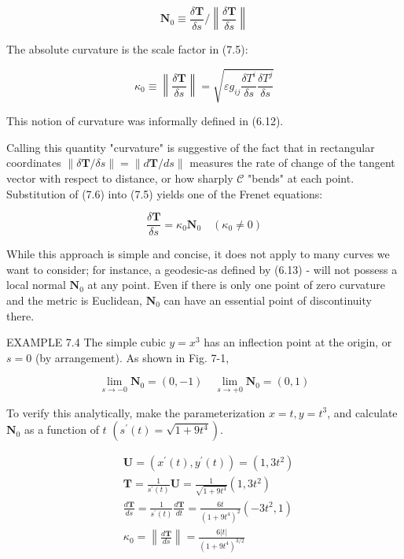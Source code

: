 \documentclass[10pt]{article}
\begin{document}
\begin{equation*}
\mathbf{N}_{0} \equiv \frac{\delta \mathbf{T}}{\delta s} /\left\|\frac{\delta \mathbf{T}}{\delta s}\right\| \tag{7.5}
\end{equation*}


The absolute curvature is the scale factor in (7.5):


\begin{equation*}
\kappa_{0} \equiv\left\|\frac{\delta \mathbf{T}}{\delta s}\right\|=\sqrt{\varepsilon g_{i j} \frac{\delta T^{i}}{\delta s} \frac{\delta T^{j}}{\delta s}} \tag{7.6}
\end{equation*}


This notion of curvature was informally defined in (6.12).

Calling this quantity "curvature" is suggestive of the fact that in rectangular coordinates $\|\delta \mathbf{T} / \delta s\|=\|d \mathbf{T} / d s\|$ measures the rate of change of the tangent vector with respect to distance, or how sharply $\mathscr{C}$ "bends" at each point. Substitution of (7.6) into (7.5) yields one of the Frenet equations:


\begin{equation*}
\frac{\delta \mathbf{T}}{\delta s}=\kappa_{0} \mathbf{N}_{0} \quad\left(\kappa_{0} \neq 0\right) \tag{7.7}
\end{equation*}


While this approach is simple and concise, it does not apply to many curves we want to consider; for instance, a geodesic-as defined by (6.13) - will not possess a local normal $\mathbf{N}_{0}$ at any point. Even if there is only one point of zero curvature and the metric is Euclidean, $\mathbf{N}_{0}$ can have an essential point of discontinuity there.

EXAMPLE 7.4 The simple cubic $y=x^{3}$ has an inflection point at the origin, or $s=0$ (by arrangement). As shown in Fig. 7-1,

$$
\lim _{s \rightarrow-0} \mathbf{N}_{0}=(0,-1) \quad \lim _{s \rightarrow+0} \mathbf{N}_{0}=(0,1)
$$

To verify this analytically, make the parameterization $x=t, y=t^{3}$, and calculate $\mathbf{N}_{0}$ as a function of $t$ $\left(s^{\prime}(t)=\sqrt{1+9 t^{4}}\right)$.

$$
\begin{aligned}
& \mathbf{U}=\left(x^{\prime}(t), y^{\prime}(t)\right)=\left(1,3 t^{2}\right) \\
& \mathbf{T}=\frac{1}{s^{\prime}(t)} \mathbf{U}=\frac{1}{\sqrt{1+9 t^{4}}}\left(1,3 t^{2}\right) \\
& \frac{d \mathbf{T}}{d s}=\frac{1}{s^{\prime}(t)} \frac{d \mathbf{T}}{d t}=\frac{6 t}{\left(1+9 t^{4}\right)^{2}}\left(-3 t^{2}, 1\right) \\
& \kappa_{0}=\left\|\frac{d \mathbf{T}}{d s}\right\|=\frac{6|t|}{\left(1+9 t^{4}\right)^{3 / 2}}
\end{aligned}
$$
\end{document}
